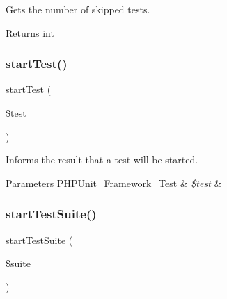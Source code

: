 Gets the number of skipped tests.

\begin{DoxyReturn}{Returns}
int 
\end{DoxyReturn}
\mbox{\label{class_p_h_p_unit___framework___test_result_a1a9bddc54f26bb3fb5c2ec9778ea5198}} 
\subsubsection{\texorpdfstring{start\+Test()}{startTest()}}
{\footnotesize\ttfamily start\+Test (\begin{DoxyParamCaption}\item[{\mbox{\hyperlink{interface_p_h_p_unit___framework___test}{P\+H\+P\+Unit\+\_\+\+Framework\+\_\+\+Test}}}]{\$test }\end{DoxyParamCaption})}

Informs the result that a test will be started.


\begin{DoxyParams}[1]{Parameters}
\mbox{\hyperlink{interface_p_h_p_unit___framework___test}{P\+H\+P\+Unit\+\_\+\+Framework\+\_\+\+Test}} & {\em \$test} & \\
\hline
\end{DoxyParams}
\mbox{\label{class_p_h_p_unit___framework___test_result_a901a86a623d83184267b21f2daee0ff5}} 
\subsubsection{\texorpdfstring{start\+Test\+Suite()}{startTestSuite()}}
{\footnotesize\ttfamily start\+Test\+Suite (\begin{DoxyParamCaption}\item[{\mbox{\hyperlink{class_p_h_p_unit___framework___test_suite}{P\+H\+P\+Unit\+\_\+\+Framework\+\_\+\+Test\+Suite}}}]{\$suite }\end{DoxyParamCaption})}

